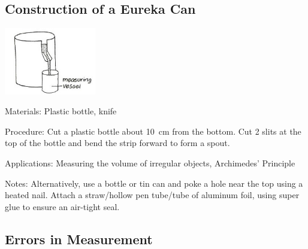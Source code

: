 \begin{multicols}{2}
\subsection{Construction of a Eureka Can} 
\label{sub:eurekacan}

\begin{center}
\includegraphics[width=0.3\textwidth]{./img/vso/overflow-can.jpg}
\end{center}

\begin{description*}
\item[Materials:]{Plastic bottle, knife}
\item[Procedure:]{Cut a plastic bottle about 10~cm from the bottom. Cut 2 slits at the top of the bottle and bend the strip forward to form a spout.}
\item[Applications:]{Measuring the volume of irregular objects, Archimedes' Principle}
\item[Notes:]{Alternatively, use a bottle or tin can and poke a hole near the top using a heated nail. Attach a straw/hollow pen tube/tube of aluminum foil, using super glue to ensure an air-tight seal.}
\end{description*}

\columnbreak

\subsection{Errors in Measurement} 
\label{sub:meas-errors}


\end{multicols}
